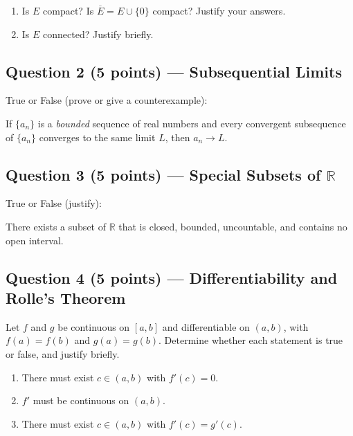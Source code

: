 \documentclass[10pt]{article}
\newcommand{\R}{\mathbb{R}}
\begin{document}
\begin{enumerate}[label=(\alph*)]
  \item Is $E$ compact? Is $\overline{E} = E \cup \{0\}$ compact? Justify your answers.
  \item Is $E$ connected? Justify briefly.
\end{enumerate}

\subsection{Question 2 \textnormal{(5 points)} --- Subsequential Limits}

True or False (prove or give a counterexample):

If $\{a_n\}$ is a \emph{bounded} sequence of real numbers and every convergent subsequence of $\{a_n\}$ converges to the same limit $L$, then $a_n \to L$.

\subsection{Question 3 \textnormal{(5 points)} --- Special Subsets of $\R$}

True or False (justify):

There exists a subset of $\R$ that is closed, bounded, uncountable, and contains no open interval.

\subsection{Question 4 \textnormal{(5 points)} --- Differentiability and Rolle's Theorem}

Let $f$ and $g$ be continuous on $[a,b]$ and differentiable on $(a,b)$, with $f(a) = f(b)$ and $g(a) = g(b)$. Determine whether each statement is true or false, and justify briefly.

\begin{enumerate}[label=(\alph*)]
  \item There must exist $c \in (a,b)$ with $f'(c) = 0$.
  \item $f'$ must be continuous on $(a,b)$.
  \item There must exist $c \in (a,b)$ with $f'(c) = g'(c)$.
\end{enumerate}

\end{document}

